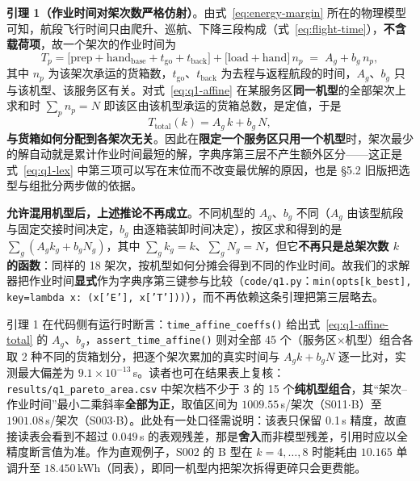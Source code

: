 \textbf{引理 1（作业时间对架次数严格仿射）}。由式~\eqref{eq:energy-margin} 所在的物理模型可知，航段飞行时间只由爬升、巡航、下降三段构成（式~\eqref{eq:flight-time}），\textbf{不含载荷项}，故一个架次的作业时间为
\begin{equation}
	T_p=\big[\mathrm{prep}+\mathrm{hand}_{\mathrm{base}}+t_{\mathrm{go}}+t_{\mathrm{back}}\big]+\big[\mathrm{load}+\mathrm{hand}\big]\,n_p \;=\; A_g+b_g\,n_p,
	\label{eq:q1-affine}
\end{equation}
其中 $n_p$ 为该架次承运的货箱数，$t_{\mathrm{go}}$、$t_{\mathrm{back}}$ 为去程与返程航段的时间，$A_g$、$b_g$ 只与该机型、该服务区有关。对式~\eqref{eq:q1-affine} 在某服务区\textbf{同一机型}的全部架次上求和时 $\sum_p n_p=N$ 即该区由该机型承运的货箱总数，是定值，于是
\begin{equation}
	T_{\mathrm{total}}(k)=A_g\,k+b_g\,N,
	\label{eq:q1-affine-total}
\end{equation}
\textbf{与货箱如何分配到各架次无关}。因此在\textbf{限定一个服务区只用一个机型}时，架次最少的解自动就是累计作业时间最短的解，字典序第三层不产生额外区分——这正是式~\eqref{eq:q1-lex} 中第三项可以写在末位而不改变最优解的原因，也是 §5.2 旧版把选型与组批分两步做的依据。

\textbf{允许混用机型后，上述推论不再成立}。不同机型的 $A_g$、$b_g$ 不同（$A_g$ 由该型航段与固定交接时间决定，$b_g$ 由逐箱装卸时间决定），按区求和得到的是 $\sum_g(A_gk_g+b_gN_g)$，其中 $\sum_g k_g=k$、$\sum_g N_g=N$，但它\textbf{不再只是总架次数 $k$ 的函数}：同样的 18 架次，按机型如何分摊会得到不同的作业时间。故我们的求解器把作业时间\textbf{显式}作为字典序第三键参与比较（\texttt{code/q1.py}：\texttt{min(opts[k\_best], key=lambda x: (x['E'], x['T']))}），而不再依赖这条引理把第三层略去。

引理 1 在代码侧有运行时断言：\texttt{time\_affine\_coeffs()} 给出式~\eqref{eq:q1-affine-total} 的 $A_g$、$b_g$，\texttt{assert\_time\_affine()} 则对全部 45 个（服务区$\times$机型）组合各取 2 种不同的货箱划分，把逐个架次累加的真实时间与 $A_g k+b_g N$ 逐一比对，实测最大偏差为 $9.1\times10^{-13}$\,s。读者也可在结果表上复核：\texttt{results/q1\_pareto\_area.csv} 中架次档不少于 3 的 15 个\textbf{纯机型组合}，其“架次--作业时间”最小二乘斜率\textbf{全部为正}，取值区间为 $1009.55$\,s/架次（S011$\cdot$B）至 $1901.08$\,s/架次（S003$\cdot$B）。此处有一处口径需说明：该表只保留 0.1\,s 精度，故直接读表会看到不超过 $0.049$\,s 的表观残差，那是\textbf{舍入}而非模型残差，引用时应以全精度断言值为准。作为直观例子，S002 的 B 型在 $k=4,\dots,8$ 时能耗由 $10.165$ 单调升至 $18.450$\,kWh（同表），即同一机型内把架次拆得更碎只会更费能。

